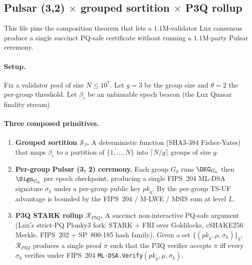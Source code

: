
\subsection*{Pulsar (3,2) $\times$ grouped sortition $\times$ P3Q rollup}

This file pins the composition theorem that lets a $1.1$M-validator
Lux consensus produce a single succinct PQ-safe certificate without
running a $1.1$M-party Pulsar ceremony.

\paragraph{Setup.}
Fix a validator pool of size $N \le 10^7$. Let $g = 3$ be the group
size and $\theta = 2$ the per-group threshold. Let $\beta_e$ be an
unbiasable epoch beacon (the Lux Quasar finality stream).

\paragraph{Three composed primitives.}

\begin{enumerate}[leftmargin=*, itemsep=0pt]
\item \textbf{Grouped sortition $\mathcal{S}_\beta$.} A deterministic
function (SHA3-384 Fisher-Yates) that maps $\beta_e$ to a partition
of $\{1, \dots, N\}$ into $\lceil N / g \rceil$ groups of size $g$.
\item \textbf{Per-group Pulsar (3, 2) ceremony.} Each group $G_k$
runs $\DKG_{G_k}$ then $\Sign_{G_k}$ per epoch checkpoint, producing
a single FIPS~204 ML-DSA signature $\sigma_k$ under a per-group
public key $\mathit{pk}_k$. By
 the per-group TS-UF advantage is bounded
by the FIPS~204 / M-LWE / MSIS sum at level $L$.
\item \textbf{P3Q STARK rollup $\mathcal{R}_{P3Q}$.} A succinct
non-interactive PQ-safe argument (Lux's strict-PQ Plonky3 fork:
STARK + FRI over Goldilocks, cSHAKE256 Merkle, FIPS~202 +
SP~800-185 hash family). Given a set $\{(\mathit{pk}_k, \mu, \sigma_k)\}_k$,
$\mathcal{R}_{P3Q}$ produces a single proof $\pi$ such that the P3Q
verifier accepts $\pi$ iff every $\sigma_k$ verifies under FIPS~204
\texttt{ML-DSA.Verify}$(\mathit{pk}_k, \mu, \sigma_k)$.
\end{enumerate}


